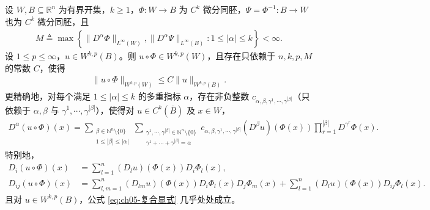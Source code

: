 \documentclass[../../main.tex]{subfiles}
\begin{document}
\begin{lemma}[$C^{k}$ 微分同胚下的复合]\label{lemma:ch05-复合Wkp}
设 $W,B\subseteq\mathbb{R}^{n}$ 为有界开集，$k\geqslant1$，$\Phi:W\to B$ 为 $C^{k}$ 微分同胚，$\Psi=\Phi^{-1}:B\to W$ 也为 $C^{k}$ 微分同胚，且
\begin{align*}
M\triangleq\max\left\{\|D^{\alpha}\Phi\|_{L^{\infty}(W)},\|D^{\alpha}\Psi\|_{L^{\infty}(B)}:1\leqslant|\alpha|\leqslant k\right\}<\infty.
\end{align*}
设 $1\leqslant p\leqslant\infty$，$u\in W^{k,p}(B)$。则 $u\circ\Phi\in W^{k,p}(W)$，且存在只依赖于 $n,k,p,M$ 的常数 $C$，使得
\begin{align}
\|u\circ\Phi\|_{W^{k,p}(W)}\leqslant C\|u\|_{W^{k,p}(B)}.
\label{eq:ch05-复合估计}
\end{align}
更精确地，对每个满足 $1\leqslant|\alpha|\leqslant k$ 的多重指标 $\alpha$，存在非负整数 $c_{\alpha,\beta,\gamma^{1},\cdots,\gamma^{|\beta|}}$（只依赖于 $\alpha,\beta$ 与 $\gamma^{1},\cdots,\gamma^{|\beta|}$），使得对 $u\in C^{k}(\overline{B})$ 及 $x\in W$，
\begin{align}
D^{\alpha}(u\circ\Phi)(x)
=\sum_{\substack{\beta\in\mathbb{N}^{n}\setminus\{0\}\\ 1\leqslant|\beta|\leqslant|\alpha|}}
\sum_{\substack{\gamma^{1},\cdots,\gamma^{|\beta|}\in\mathbb{N}^{n}\setminus\{0\}\\ \gamma^{1}+\cdots+\gamma^{|\beta|}=\alpha}}
c_{\alpha,\beta,\gamma^{1},\cdots,\gamma^{|\beta|}}
(D^{\beta}u)(\Phi(x))\prod_{r=1}^{|\beta|}D^{\gamma^{r}}\Phi(x).
\label{eq:ch05-复合显式}
\end{align}
特别地，
\begin{align}
D_i(u\circ\Phi)(x)&=\sum_{l=1}^{n}(D_lu)(\Phi(x))D_i\Phi_l(x),\label{eq:ch05-复合一阶}\\
D_{ij}(u\circ\Phi)(x)&=\sum_{l,m=1}^{n}(D_{lm}u)(\Phi(x))D_i\Phi_l(x)D_j\Phi_m(x)
+\sum_{l=1}^{n}(D_lu)(\Phi(x))D_{ij}\Phi_l(x).\label{eq:ch05-复合二阶}
\end{align}
且对 $u\in W^{k,p}(B)$，公式 \eqref{eq:ch05-复合显式} 几乎处处成立。
\end{lemma}
\end{document}
